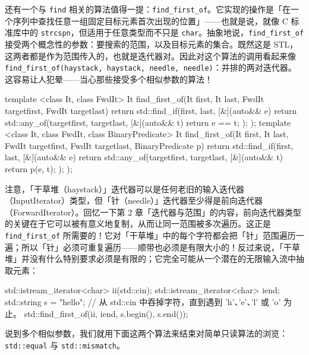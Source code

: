 还有一个与 \texttt{find} 相关的算法值得一提：\texttt{find\_\allowbreak{}first\_\allowbreak{}of}。它实现的操作是「在一个序列中查找任意一组固定目标元素首次出现的位置」——也就是说，就像 C 标准库中的 \texttt{strcspn}，但适用于任意类型而不只是 \texttt{char}。抽象地说，\texttt{find\_\allowbreak{}first\_\allowbreak{}of} 接受两个概念性的参数：要搜索的范围，以及目标元素的集合。既然这是 STL，这两者都是作为范围传入的，也就是迭代器对。因此对这个算法的调用看起来像 \texttt{find\_\allowbreak{}first\_\allowbreak{}of(\allowbreak{}haystack,\allowbreak{} haystack,\allowbreak{} needle,\allowbreak{} needle)\allowbreak{}}：并排的两对迭代器。这容易让人犯晕——当心那些接受多个相似参数的算法！

\begin{codebox}[cpp]
    template <class It, class FwdIt>
    It find_first_of(It first, It last, FwdIt targetfirst,
      FwdIt targetlast)
    {
      return std::find_if(first, last, [&](auto&& e) {
        return std::any_of(targetfirst, targetlast, [&](auto&& t) {
          return e == t;
        });
      });
    }
    template <class It, class FwdIt, class BinaryPredicate>
    It find_first_of(It first, It last, FwdIt targetfirst,
      FwdIt targetlast, BinaryPredicate p)
    {
      return std::find_if(first, last, [&](auto&& e) {
        return std::any_of(targetfirst, targetlast, [&](auto&& t) {
          return p(e, t);
        });
      });
    }
\end{codebox}

注意，「干草堆（haystack）」迭代器可以是任何老旧的输入迭代器（InputIterator）类型，但「针（needle）」迭代器至少得是前向迭代器（ForwardIterator）。回忆一下第 2 章「迭代器与范围」的内容，前向迭代器类型的关键在于它可以被有意义地复制，从而让同一范围被多次遍历。这正是 \texttt{find\_\allowbreak{}first\_\allowbreak{}of} 所需要的！它对「干草堆」中的每个字符都会把「针」范围遍历一遍；所以「针」必须可重复遍历——顺带也必须是有限大小的！反过来说，「干草堆」并没有什么特别要求必须是有限的；它完全可能从一个潜在的无限输入流中抽取元素：

\begin{codebox}[cpp]
    std::istream_iterator<char> ii(std::cin);
    std::istream_iterator<char> iend{};
    std::string s = "hello";
    // 从 std::cin 中吞掉字符，直到遇到 'h'、'e'、'l' 或 'o' 为止。
    std::find_first_of(ii, iend, s.begin(), s.end());
\end{codebox}

说到多个相似参数，我们就用下面这两个算法来结束对简单只读算法的浏览：\texttt{std::\allowbreak{}equal} 与 \texttt{std::\allowbreak{}mismatch}。

